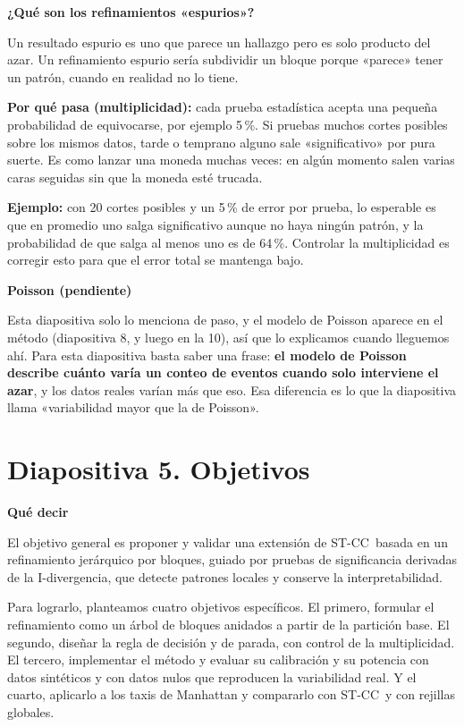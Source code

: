 \documentclass[11pt,a4paper]{article}
\newcommand{\cajainicio}[3]{\par\medskip\noindent
  \begin{lrbox}{\cajabox}\begin{minipage}{\dimexpr\linewidth-2\fboxsep-2\fboxrule\relax}%
  \textbf{\color{#1}#3}\par\smallskip}
\newcommand{\cajafin}[2]{\end{minipage}\end{lrbox}\fcolorbox{#1}{#2}{\usebox{\cajabox}}\par\medskip}
\newenvironment{guion}{\cajainicio{ucspblue}{ucspblue!6}{Qué decir}}{\cajafin{ucspblue}{ucspblue!6}}
\newenvironment{nota}[1]{\cajainicio{acc}{acc!7}{#1}}{\cajafin{acc}{acc!7}}
\newcommand{\STCC}{ST-CC}
\begin{document}
\begin{nota}{¿Qué son los refinamientos «espurios»?}
Un resultado espurio es uno que parece un hallazgo pero es solo producto del azar. Un refinamiento espurio sería subdividir un bloque porque «parece» tener un patrón, cuando en realidad no lo tiene.

\textbf{Por qué pasa (multiplicidad):} cada prueba estadística acepta una pequeña probabilidad de equivocarse, por ejemplo 5\,\%. Si pruebas muchos cortes posibles sobre los mismos datos, tarde o temprano alguno sale «significativo» por pura suerte. Es como lanzar una moneda muchas veces: en algún momento salen varias caras seguidas sin que la moneda esté trucada.

\textbf{Ejemplo:} con 20 cortes posibles y un 5\,\% de error por prueba, lo esperable es que en promedio uno salga significativo aunque no haya ningún patrón, y la probabilidad de que salga al menos uno es de 64\,\%. Controlar la multiplicidad es corregir esto para que el error total se mantenga bajo.
\end{nota}

\begin{nota}{Poisson (pendiente)}
Esta diapositiva solo lo menciona de paso, y el modelo de Poisson aparece en el método (diapositiva 8, y luego en la 10), así que lo explicamos cuando lleguemos ahí. Para esta diapositiva basta saber una frase: \textbf{el modelo de Poisson describe cuánto varía un conteo de eventos cuando solo interviene el azar}, y los datos reales varían más que eso. Esa diferencia es lo que la diapositiva llama «variabilidad mayor que la de Poisson».
\end{nota}

\newpage
\section*{Diapositiva 5. Objetivos}

\begin{guion}
El objetivo general es proponer y validar una extensión de \STCC\ basada en un refinamiento jerárquico por bloques, guiado por pruebas de significancia derivadas de la I-divergencia, que detecte patrones locales y conserve la interpretabilidad.

Para lograrlo, planteamos cuatro objetivos específicos. El primero, formular el refinamiento como un árbol de bloques anidados a partir de la partición base. El segundo, diseñar la regla de decisión y de parada, con control de la multiplicidad. El tercero, implementar el método y evaluar su calibración y su potencia con datos sintéticos y con datos nulos que reproducen la variabilidad real. Y el cuarto, aplicarlo a los taxis de Manhattan y compararlo con \STCC\ y con rejillas globales.
\end{guion}
\end{document}
